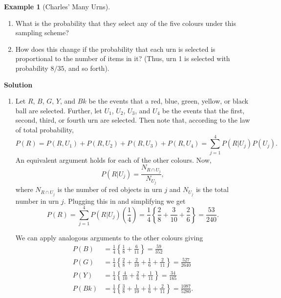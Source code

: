 \documentclass[
  letterpaper,
  DIV=11,
  numbers=noendperiod]{scrreprt}
\providecommand{\tightlist}{%
  \setlength{\itemsep}{0pt}\setlength{\parskip}{0pt}}\usepackage{longtable,booktabs,array}
\theoremstyle{definition}
\theoremstyle{definition}
\theoremstyle{definition}
\newtheorem{example}{Example}[chapter]
\theoremstyle{remark}
\begin{document}
\begin{example}[Charles' Many
Urns]
\begin{enumerate}
\def\labelenumi{\alph{enumi}.}
\tightlist
\item
  What is the probability that they select any of the five colours under
  this sampling scheme?
\item
  How does this change if the probability that each urn is selected is
  proportional to the number of items in it? (Thus, urn 1 is selected
  with probability \(8/35\), and so forth).
\end{enumerate}

\begin{tcolorbox}[enhanced jigsaw, colback=white, breakable, rightrule=.15mm, leftrule=.75mm, toprule=.15mm, left=2mm, arc=.35mm, opacityback=0, bottomrule=.15mm]

\vspace{-3mm}\textbf{Solution}\vspace{3mm}

\begin{enumerate}
\def\labelenumi{\alph{enumi}.}
\item
  Let \(R\), \(B\), \(G\), \(Y\), and \(Bk\) be the events that a red,
  blue, green, yellow, or black ball are selected. Further, let \(U_1\),
  \(U_2\), \(U_3\), and \(U_4\) be the events that the first, second,
  third, or fourth urn are selected. Then note that, according to the
  law of total probability,
  \[P(R) = P(R, U_1) + P(R, U_2) + P(R, U_3) + P(R, U_4) = \sum_{j=1}^4 P(R|U_j)P(U_j).\]
  An equivalent argument holds for each of the other colours. Now,
  \[P(R|U_j) = \frac{N_{R\cap U_j}}{N_{U_j}},\] where \(N_{R\cap U_j}\)
  is the number of red objects in urn \(j\) and \(N_{U_j}\) is the total
  number in urn \(j\). Plugging this in and simplifying we get
  \[P(R) = \sum_{j=1}^4P(R|U_j)\left(\frac{1}{4}\right) = \frac{1}{4}\left\{\frac{2}{8} + \frac{3}{10} + \frac{2}{6}\right\} = \frac{53}{240}.\]

  We can apply analogous arguments to the other colours giving
  \begin{align*}
  P(B) &= \frac{1}{4}\left\{\frac{1}{8} + \frac{6}{11}\right\} = \frac{59}{352} \\
  P(G) &= \frac{1}{4}\left\{\frac{2}{8} + \frac{2}{10} + \frac{1}{6} + \frac{2}{11}\right\} = \frac{527}{2640}\\
  P(Y) &= \frac{1}{4}\left\{\frac{4}{10} + \frac{2}{6} + \frac{1}{11}\right\} = \frac{34}{165}\\
  P(Bk) &= \frac{1}{4}\left\{\frac{3}{8} + \frac{1}{10} + \frac{1}{6} + \frac{2}{11}\right\} = \frac{1087}{5280}.
  \end{align*}


\end{enumerate}
\end{tcolorbox}
\end{example}
\end{document}
